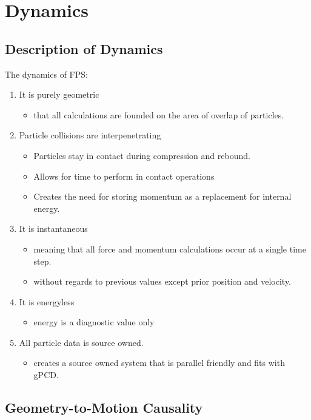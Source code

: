 \newpage
\section{Dynamics}

\subsection{Description of Dynamics}

The dynamics of FPS:

\begin{enumerate}
\item It is purely geometric 
	\begin{itemize}
	\item that all calculations are founded on the area of overlap of particles.
	\end{itemize}
\item Particle collisions are interpenetrating
	\begin{itemize}
	\item Particles stay in contact during compression and rebound.
	\item Allows for time to perform in contact operations
	\item Creates the need for storing momentum as a replacement for internal energy.
	\end{itemize}
\item It is instantaneous
	\begin{itemize}
	\item  meaning that all force and momentum calculations occur at a single time step. 
	\item without regards to previous values except prior position and velocity.
	\end{itemize}
\item It is energyless
	\begin{itemize}
	\item energy is a diagnostic value only
	\end{itemize}
\item All particle data is source owned.
	\begin{itemize}
	\item creates a source owned system that is parallel friendly and fits with gPCD.
	\end{itemize}
\end{enumerate} 

\subsection{Geometry-to-Motion Causality}

